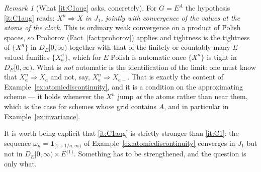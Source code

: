 \documentclass[11pt,a4paper]{article}
\theoremstyle{plain}
\theoremstyle{definition}
\theoremstyle{remark}
\newtheorem{remark}[theorem]{Remark}
\newcommand{\DE}{D_E[0,\infty)}
\newcommand{\one}{\mathbf{1}}
\DeclareMathOperator*{\wto}{\Rightarrow}
\begin{document}
\begin{remark}[What \ref{it:C1aug} asks, concretely]
  \label{rem:C1aug}
  For $G = E^A$ the hypothesis \ref{it:C1aug} reads: \emph{$X^n \wto X$ in $J_1$,
  jointly with convergence of the values at the atoms of the clock}.  This is
  ordinary weak convergence on a product of Polish spaces, so Prohorov
  (Fact~\ref{fact:prohorov}) applies and tightness is the tightness of
  $\{X^n\}$ in $\DE$ together with that of the finitely or countably many
  $E$-valued families $\{X^n_a\}$, which for $E$ Polish is automatic once
  $\{X^n\}$ is tight in $\DE$.  What is \emph{not} automatic is the
  identification of the limit: one must know that $X^n_a \wto X_a$ and not, say,
  $X^n_a \wto X_{a-}$.  That is exactly the content of
  Example~\ref{ex:atomicdiscontinuity}, and it is a condition on the
  approximating scheme --- it holds whenever the $X^n$ jump \emph{at} the atoms
  rather than near them, which is the case for schemes whose grid contains $A$,
  and in particular in Example~\ref{ex:invariance}.

  It is worth being explicit that \ref{it:C1aug} is strictly stronger than
  \ref{it:C1}: the sequence $\omega_n = \one_{[1+1/n,\infty)}$ of
  Example~\ref{ex:atomicdiscontinuity} converges in $J_1$ but not in
  $\DE \times E^{\{1\}}$.  Something has to be strengthened, and the question is
  only what.
\end{remark}
\end{document}
